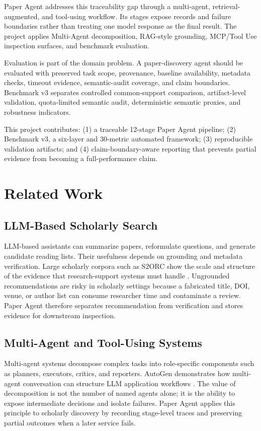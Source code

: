 \documentclass[10pt,twocolumn]{article}
\begin{document}
Paper Agent addresses this traceability gap through a multi-agent, retrieval-augmented, and tool-using workflow. Its stages expose records and failure boundaries rather than treating one model response as the final result. The project applies Multi-Agent decomposition, RAG-style grounding, MCP/Tool Use inspection surfaces, and benchmark evaluation.

Evaluation is part of the domain problem. A paper-discovery agent should be evaluated with preserved task scope, provenance, baseline availability, metadata checks, timeout evidence, semantic-audit coverage, and claim boundaries. Benchmark v3 separates controlled common-support comparison, artifact-level validation, quota-limited semantic audit, deterministic semantic proxies, and robustness indicators.

This project contributes: (1) a traceable 12-stage Paper Agent pipeline; (2) Benchmark v3, a six-layer and 30-metric automated framework; (3) reproducible validation artifacts; and (4) claim-boundary-aware reporting that prevents partial evidence from becoming a full-performance claim.

\section{Related Work}
\subsection{LLM-Based Scholarly Search}
LLM-based assistants can summarize papers, reformulate questions, and generate candidate reading lists. Their usefulness depends on grounding and metadata verification. Large scholarly corpora such as S2ORC show the scale and structure of the evidence that research-support systems must handle \cite{lo2020s2orc}. Ungrounded recommendations are risky in scholarly settings because a fabricated title, DOI, venue, or author list can consume researcher time and contaminate a review. Paper Agent therefore separates recommendation from verification and stores evidence for downstream inspection.

\subsection{Multi-Agent and Tool-Using Systems}
Multi-agent systems decompose complex tasks into role-specific components such as planners, executors, critics, and reporters. AutoGen demonstrates how multi-agent conversation can structure LLM application workflows \cite{wu2023autogen}. The value of decomposition is not the number of named agents alone; it is the ability to expose intermediate decisions and isolate failures. Paper Agent applies this principle to scholarly discovery by recording stage-level traces and preserving partial outcomes when a later service fails.
\end{document}
